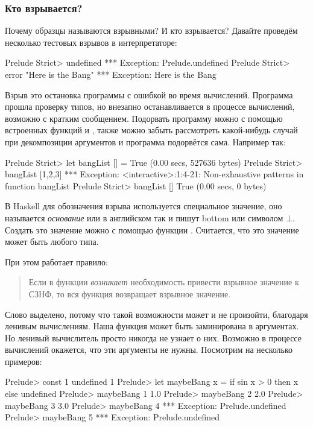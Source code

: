\subsubsection{Кто взрывается?}

Почему образцы называются взрывными? И кто взрывается? 
Давайте проведём несколько тестовых взрывов в интерпретаторе:

\begin{code}
Prelude Strict> undefined
*** Exception: Prelude.undefined
Prelude Strict> error "Here is the Bang"
*** Exception: Here is the Bang
\end{code}

Взрыв это остановка программы с ошибкой во время вычислений.
Программа прошла проверку типов, но внезапно останавливается
в процессе вычислений, возможно с кратким сообщением.
Подорвать программу можно с помощью встроенных функций
 и , также можно забыть рассмотреть
какой-нибудь случай при декомпозиции аргументов и программа
подорвётся сама. Например так:

\begin{code}

Prelude Strict> let bangList [] = True
(0.00 secs, 527636 bytes)
Prelude Strict> bangList [1,2,3]
*** Exception: <interactive>:1:4-21: Non-exhaustive patterns in function bangList
Prelude Strict> bangList []
True
(0.00 secs, 0 bytes)
\end{code}

В Haskell для обозначения взрыва используется специальное
значение, оно называется \emph{основание} или  
в английском так и пишут bottom или символом $\bot$. Создать это значение 
можно с помощью функции . Считается, что это
значение может быть любого типа. 

При этом работает правило:

\begin{quote}
Если в функции \emph{возникает} необходимость привести
взрывное значение к СЗНФ, то вся функция возвращает 
взрывное значение.
\end{quote}

Слово  выделено, потому что такой возможности
может и не произойти, благодаря ленивым вычислениям. 
Наша функция может быть заминирована в аргументах. Но ленивый
вычислитель просто никогда не узнает о них. Возможно
в процессе вычислений окажется, что эти аргументы не нужны.
Посмотрим на несколько примеров:

\begin{code}
Prelude> const 1 undefined
1
Prelude> let maybeBang x = if sin x > 0 then x else undefined
Prelude> maybeBang 1
1.0
Prelude> maybeBang 2
2.0
Prelude> maybeBang 3
3.0
Prelude> maybeBang 4
*** Exception: Prelude.undefined
Prelude> maybeBang 5
*** Exception: Prelude.undefined
\end{code}

